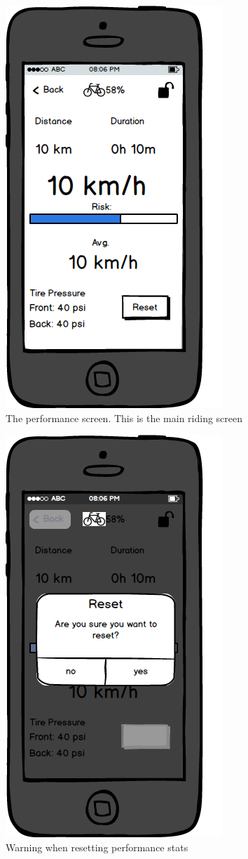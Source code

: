 \documentclass[a4paper]{report}
\begin{document}
\clearpage
\begin{figure}
\centering
\includegraphics[scale=0.9]{figures/prototype_2/performance}
\caption{The performance screen. This is the main riding screen}
\end{figure}
\clearpage
\begin{figure}
\centering
\includegraphics[scale=0.9]{figures/prototype_2/performance_reset}
\caption{Warning when resetting performance stats}
\end{figure}
\end{document}

